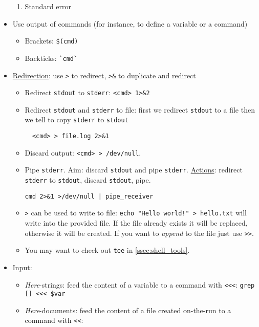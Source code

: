 \documentclass[a4paper,12pt,%
              final%
              ]{article}
\begin{document}
\begin{itemize}
\begin{enumerate}[start=0,label={\texttt{\arabic*} :}]
      \item Standard error
    \end{enumerate}
  \item Use output of commands (for instance, to define a variable or a command)
    \begin{itemize}
      \item Brackets: \verb|$(cmd)|
      \item Backticks: \verb|`cmd`|
    \end{itemize}
  \item \href{https://www.gnu.org/software/bash/manual/bash.html#Redirections}{Redirection}: use \verb|>| to redirect, \verb|>&| to duplicate and redirect
    \begin{itemize}
      \item Redirect \texttt{stdout} to \texttt{stderr}: \verb|<cmd> 1>&2|
      \item Redirect \texttt{stdout} and \texttt{stderr} to file: first we redirect \texttt{stdout} to a file then we tell to copy \texttt{stderr} to \texttt{stdout}
\begin{verbatim}
  <cmd> > file.log 2>&1
\end{verbatim}
      \item Discard output: \texttt{<cmd> > /dev/null}.
      \item Pipe \texttt{stderr}. Aim: discard \texttt{stdout} and pipe \texttt{stderr}. \href{https://stackoverflow.com/questions/2342826/how-can-i-pipe-stderr-and-not-stdout}{Actions}: redirect \texttt{stderr} to \texttt{stdout}, discard \texttt{stdout}, pipe.
\begin{verbatim}
cmd 2>&1 >/dev/null | pipe_receiver
\end{verbatim}
      \item \verb|>| can be used to write to file: \verb|echo "Hello world!" > hello.txt| will write into the provided file. If the file already exists it will be replaced, otherwise it will be created. If you want to \emph{append} to the file just use \verb|>>|.
      \item You may want to check out \texttt{tee} in \ref{ssec:shell_tools}.
    \end{itemize}
  \item Input:
    \begin{itemize}
      \item \emph{Here}-strings: feed the content of a variable to a command with \verb|<<<|: \verb|grep [] <<< $var|
      \item \emph{Here}-documents: feed the content of a file created on-the-run to a command with  \verb|<<|:

\end{itemize}
\end{itemize}
\end{document}
